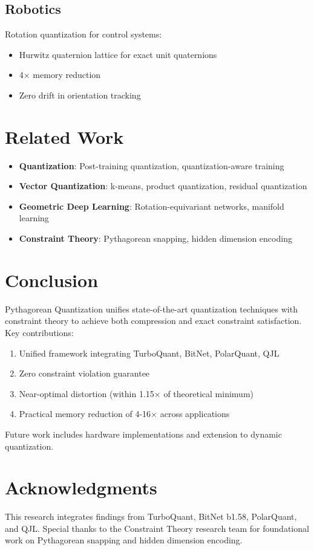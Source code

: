 \documentclass{article}
\begin{document}
\subsection{Robotics}

Rotation quantization for control systems:
\begin{itemize}
    \item Hurwitz quaternion lattice for exact unit quaternions
    \item 4$\times$ memory reduction
    \item Zero drift in orientation tracking
\end{itemize}

\section{Related Work}

\begin{itemize}
    \item \textbf{Quantization}: Post-training quantization, quantization-aware training
    \item \textbf{Vector Quantization}: k-means, product quantization, residual quantization
    \item \textbf{Geometric Deep Learning}: Rotation-equivariant networks, manifold learning
    \item \textbf{Constraint Theory}: Pythagorean snapping, hidden dimension encoding
\end{itemize}

\section{Conclusion}

Pythagorean Quantization unifies state-of-the-art quantization techniques with constraint theory to achieve both compression and exact constraint satisfaction. Key contributions:

\begin{enumerate}
    \item Unified framework integrating TurboQuant, BitNet, PolarQuant, QJL
    \item Zero constraint violation guarantee
    \item Near-optimal distortion (within 1.15$\times$ of theoretical minimum)
    \item Practical memory reduction of 4-16$\times$ across applications
\end{enumerate}

Future work includes hardware implementations and extension to dynamic quantization.

\section*{Acknowledgments}

This research integrates findings from TurboQuant, BitNet b1.58, PolarQuant, and QJL. Special thanks to the Constraint Theory research team for foundational work on Pythagorean snapping and hidden dimension encoding.



\end{document}
